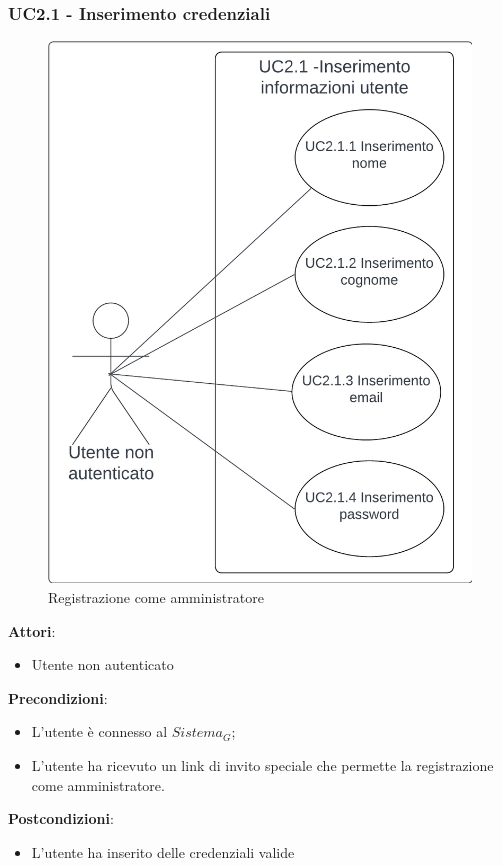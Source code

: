 \subsubsection{UC2.1 - Inserimento credenziali}\label{usecase:2_1}
\begin{figure}[H]
    \centering
    \includegraphics[scale=0.7]{ucd/UCD2.1.png}
\caption{Registrazione come amministratore}
\end{figure}
\textbf{Attori}:
\begin{itemize}
    \item Utente non autenticato
\end{itemize}
\textbf{Precondizioni}:
\begin{itemize}
     \item L'utente è connesso al $\textit{Sistema}_G$;
    \item L'utente ha ricevuto un link di invito speciale che permette la registrazione come amministratore.
\end{itemize}
\textbf{Postcondizioni}:
\begin{itemize}
    \item L'utente ha inserito delle credenziali valide
\end{itemize}
